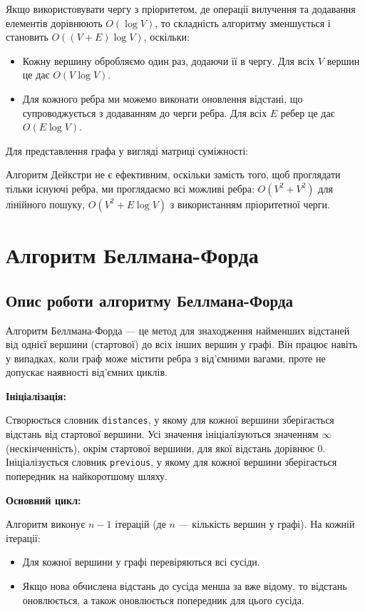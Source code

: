 \documentclass[a4paper,12pt]{article}
\begin{document}
Якщо використовувати чергу з пріоритетом, де операції вилучення та додавання елементів дорівнюють $O(\log V)$, то складність алгоритму зменшується і становить $O((V + E) \log V)$, оскільки:

\begin{itemize}
    \item Кожну вершину обробляємо один раз, додаючи її в чергу. Для всіх $V$ вершин це дає $O(V \log V)$.
    \item Для кожного ребра ми можемо виконати оновлення відстані, що супроводжується з додаванням до черги ребра. Для всіх $E$ ребер це дає $O(E \log V)$.
\end{itemize}

Для представлення графа у вигляді матриці суміжності:

Алгоритм Дейкстри не є ефективним, оскільки замість того, щоб проглядати тільки існуючі ребра, ми проглядаємо всі можливі ребра: $O(V^2 + V^2)$ для лінійного пошуку, $O(V^2 + E \log V)$ 
з використанням пріоритетної черги.

\section{Алгоритм Беллмана-Форда}

\subsection{Опис роботи алгоритму Беллмана-Форда}
Алгоритм Беллмана-Форда — це метод для знаходження найменших відстаней від однієї вершини (стартової) до всіх інших вершин у графі. 
Він працює навіть у випадках, коли граф може містити ребра з від'ємними вагами, проте не допускає наявності від'ємних циклів.

\textbf{Ініціалізація:}

Створюється словник \texttt{distances}, у якому для кожної вершини зберігається відстань від стартової вершини. Усі значення ініціалізуються значенням $\infty$ (нескінченність), 
окрім стартової вершини, для якої відстань дорівнює $0$.  
Ініціалізується словник \texttt{previous}, у якому для кожної вершини зберігається попередник на найкоротшому шляху.

\textbf{Основний цикл:}

Алгоритм виконує $n-1$ ітерацій (де $n$ — кількість вершин у графі). На кожній ітерації:
\begin{itemize}
    \item Для кожної вершини у графі перевіряються всі сусіди.
    \item Якщо нова обчислена відстань до сусіда менша за вже відому, то відстань оновлюється, а також оновлюється попередник для цього сусіда.
\end{itemize}
\end{document}
